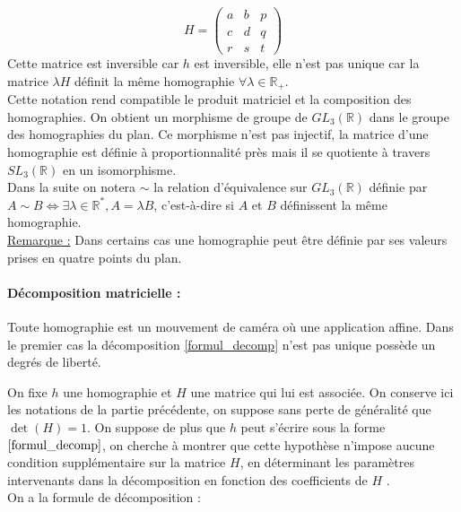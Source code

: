 \begin{prop}
	\begin{equation*}
	H=\begin{pmatrix}
	a&b&p\\c&d&q\\r&s&t
	\end{pmatrix}
	\end{equation*}
	Cette matrice est inversible car $h$ est inversible, elle n'est pas unique car la matrice $\lambda H$ définit la même homographie $\forall \lambda \in \mathbb{R}_+$.\\
Cette notation rend compatible le produit matriciel et la composition des homographies. On obtient un morphisme de groupe de $GL_{3}(\mathbb{R})$ dans le groupe des homographies du plan. Ce morphisme n'est pas injectif, la matrice d'une homographie est définie à proportionnalité près mais il se quotiente à travers $SL_{3}(\mathbb{R})$ en un isomorphisme.\\
Dans la suite on notera $\sim$ la relation d'équivalence  sur $GL_{3}(\mathbb{R})$ définie par $A\sim B \iff \exists \lambda\in \mathbb{R}^{*} , A=\lambda B$, c'est-à-dire si $A$ et $B$ définissent la même homographie.\\
\underline{Remarque :} Dans certains cas une homographie peut être définie par ses valeurs prises en quatre points du plan.\\



\paragraph{Décomposition matricielle :}
\begin{prop}
Toute homographie est un mouvement de caméra où une application affine. Dans le premier cas la décomposition \ref{formul_decomp} n'est pas unique possède un degrés de liberté.
\end{prop}
On fixe $h$ une homographie et $H$ une matrice qui lui est associée. On conserve ici les notations de la partie précédente, on suppose sans perte de généralité que $\det (H)=1$. On suppose de plus que $h$ peut s'écrire sous la forme $\ref{formul_decomp}$, on cherche à montrer que cette hypothèse n'impose aucune condition supplémentaire sur la matrice $H$, en déterminant les paramètres intervenants dans la décomposition en fonction des coefficients de $H$ .\\
On a la formule de décomposition :


\end{prop}
